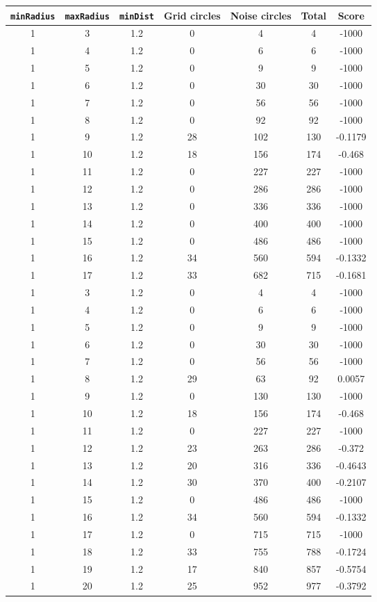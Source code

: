 \documentclass[letterpaper, 12pt]{article}
\begin{document}
\begin{longtable}{|c|c|c|c|c|c|c|}
\hline
\textbf{\texttt{minRadius}} & \textbf{\texttt{maxRadius}} & \textbf{\texttt{minDist}} & \textbf{Grid circles} & \textbf{Noise circles} & \textbf{Total} & \textbf{Score} \\
\hline
1 & 3 & 1.2 & 0 & 4 & 4 & -1000 \\
\hline
1 & 4 & 1.2 & 0 & 6 & 6 & -1000 \\
\hline
1 & 5 & 1.2 & 0 & 9 & 9 & -1000 \\
\hline
1 & 6 & 1.2 & 0 & 30 & 30 & -1000 \\
\hline
1 & 7 & 1.2 & 0 & 56 & 56 & -1000 \\
\hline
1 & 8 & 1.2 & 0 & 92 & 92 & -1000 \\
\hline
1 & 9 & 1.2 & 28 & 102 & 130 & -0.1179 \\
\hline
1 & 10 & 1.2 & 18 & 156 & 174 & -0.468 \\
\hline
1 & 11 & 1.2 & 0 & 227 & 227 & -1000 \\
\hline
1 & 12 & 1.2 & 0 & 286 & 286 & -1000 \\
\hline
1 & 13 & 1.2 & 0 & 336 & 336 & -1000 \\
\hline
1 & 14 & 1.2 & 0 & 400 & 400 & -1000 \\
\hline
1 & 15 & 1.2 & 0 & 486 & 486 & -1000 \\
\hline
1 & 16 & 1.2 & 34 & 560 & 594 & -0.1332 \\
\hline
1 & 17 & 1.2 & 33 & 682 & 715 & -0.1681 \\
\hline
1 & 3 & 1.2 & 0 & 4 & 4 & -1000 \\
\hline
1 & 4 & 1.2 & 0 & 6 & 6 & -1000 \\
\hline
1 & 5 & 1.2 & 0 & 9 & 9 & -1000 \\
\hline
1 & 6 & 1.2 & 0 & 30 & 30 & -1000 \\
\hline
1 & 7 & 1.2 & 0 & 56 & 56 & -1000 \\
\hline
1 & 8 & 1.2 & 29 & 63 & 92 & 0.0057 \\
\hline
1 & 9 & 1.2 & 0 & 130 & 130 & -1000 \\
\hline
1 & 10 & 1.2 & 18 & 156 & 174 & -0.468 \\
\hline
1 & 11 & 1.2 & 0 & 227 & 227 & -1000 \\
\hline
1 & 12 & 1.2 & 23 & 263 & 286 & -0.372 \\
\hline
1 & 13 & 1.2 & 20 & 316 & 336 & -0.4643 \\
\hline
1 & 14 & 1.2 & 30 & 370 & 400 & -0.2107 \\
\hline
1 & 15 & 1.2 & 0 & 486 & 486 & -1000 \\
\hline
1 & 16 & 1.2 & 34 & 560 & 594 & -0.1332 \\
\hline
1 & 17 & 1.2 & 0 & 715 & 715 & -1000 \\
\hline
1 & 18 & 1.2 & 33 & 755 & 788 & -0.1724 \\
\hline
1 & 19 & 1.2 & 17 & 840 & 857 & -0.5754 \\
\hline
1 & 20 & 1.2 & 25 & 952 & 977 & -0.3792 \\
\hline
\end{longtable}
\end{document}
